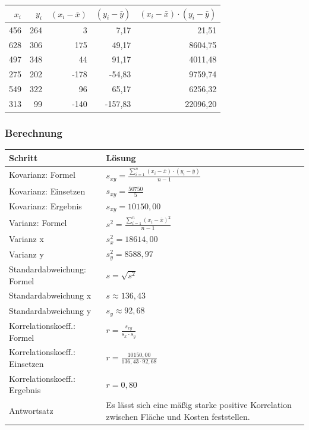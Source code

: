 \documentclass[
  11pt,
  ngerman,
  a4paper,
]{report}
\begin{document}
\begin{table}[H]
\centering
\begin{tabular}{rrrrr}
\toprule
\textbf{$x_i$} & \textbf{$y_i$} & \textbf{$(x_i-\bar{x})$} & \textbf{$(y_i-\bar{y})$} & \textbf{$(x_i-\bar{x})\cdot(y_i-\bar{y})$}\\
\midrule
456 & 264 & 3 & 7,17 & 21,51\\
628 & 306 & 175 & 49,17 & 8604,75\\
497 & 348 & 44 & 91,17 & 4011,48\\
275 & 202 & -178 & -54,83 & 9759,74\\
549 & 322 & 96 & 65,17 & 6256,32\\
313 & 99 & -140 & -157,83 & 22096,20\\
\bottomrule
\end{tabular}
\end{table}

\hypertarget{berechnung}{%
\subsubsection{Berechnung}\label{berechnung}}

\begin{table}[H]
\centering
\begin{tabular}{ll}
\toprule
\textbf{Schritt} & \textbf{Lösung}\\
\midrule
Kovarianz: Formel & $s_{xy}=\frac{\displaystyle \sum_{i=1}^{n}(x_{i}- \bar{x})\cdot(y_{i}-\bar{y})}{n-1}$\\
Kovarianz: Einsetzen & $s_{xy}=\frac{50750}{5}$\\
Kovarianz: Ergebnis & $s_{xy}=10150{,}00$\\
Varianz: Formel & $s^2=\frac{\sum\limits_{i=1}^{n}(x_{i}-\bar{x})^2}{n-1}$\\
Varianz x & $s^2_x=18614{,}00$\\
Varianz y & $s^2_y=8588{,}97$\\
Standardabweichung: Formel & $s=\sqrt{s^2}$\\
Standardabweichung x & $s\approx136{,}43$\\
Standardabweichung y & $s_y\approx92{,}68$\\
Korrelationskoeff.: Formel & $r=\frac{s_{xy}}{s_x \cdot s_y}$\\
Korrelationskoeff.: Einsetzen & $r=\frac{10150{,}00}{136{,}43 \cdot 92{,}68}$\\
Korrelationskoeff.: Ergebnis & $r=0{,}80$\\
Antwortsatz & Es lässt sich eine mäßig starke positive Korrelation zwischen Fläche und Kosten feststellen.\\
\bottomrule
\end{tabular}
\end{table}
\end{document}
